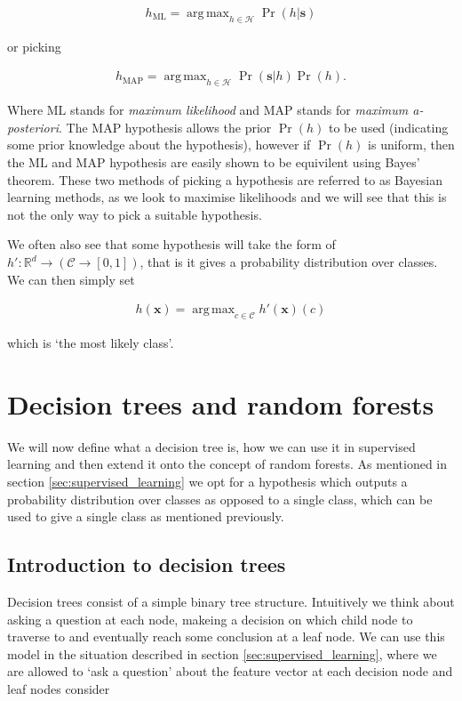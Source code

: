 \documentclass[12pt,twoside,notitlepage]{report}
\newcommand{\vc}[1]{\mathbf{#1}}
\newcommand{\cl}[1]{\mathcal{#1}}
\newcommand{\bb}[1]{\mathbb{#1}}
\DeclareMathOperator*{\argmax}{arg\,max}
\newcommand{\ML}{\text{ML}}
\newcommand{\MAP}{\text{MAP}}
\begin{document}
        \begin{align}
            h_{\ML} = \argmax_{h\in\cl{H}} \Pr(h | \vc{s})
        \end{align}

        or picking

        \begin{align}
            h_{\MAP} = \argmax_{h\in\cl{H}} \Pr(\vc{s} | h) \Pr(h).
        \end{align} 

        Where $\ML$ stands for \textit{maximum likelihood} and $\MAP$ stands for \textit{maximum a-posteriori}. The $\MAP$ 
        hypothesis allows the prior $\Pr(h)$ to be used (indicating some prior knowledge about the hypothesis), however 
        if $\Pr(h)$ is uniform, then the $\ML$ and $\MAP$ hypothesis are easily shown to be equivilent using Bayes' theorem. 
        These two methods of picking a hypothesis are referred to as Bayesian learning methods, as we look to maximise 
        likelihoods and we will see that this is not the only way to pick a suitable hypothesis. \cite{russell1995modern}

        We often also see that some hypothesis will take the form of $h':\bb{R}^d \rightarrow (\cl{C} \rightarrow [0,1])$, 
        that is it gives a probability distribution over classes. We can then simply set 
        
        \begin{align}
            h(\vc{x}) = \argmax_{c\in\cl{C}} h'(\vc{x})(c)
        \end{align}

        which is `the most likely class'.

        



    \section{Decision trees and random forests} \label{sec:rand_forest}
        We will now define what a decision tree is, how we can use it in supervised learning and then extend it onto 
        the concept of random forests. As mentioned in section \ref{sec:supervised_learning} we opt for a hypothesis 
        which outputs a probability distribution over classes as opposed to a single class, which can be used to give 
        a single class as mentioned previously.

        \subsection{Introduction to decision trees}
            Decision trees consist of a simple binary tree structure. Intuitively we think about asking a question at each 
            node, makeing a decision on which child node to traverse to and eventually reach some conclusion at a leaf node. 
            We can use this model in the situation described in section \ref{sec:supervised_learning}, where we are allowed 
            to `ask a question' about the feature vector at each decision node and leaf nodes consider
\end{document}
